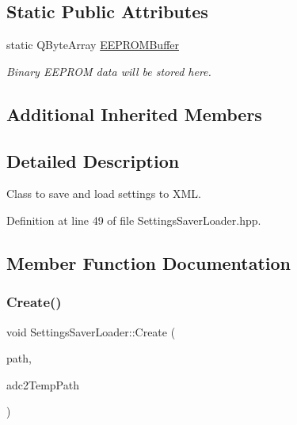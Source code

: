 \subsection*{Static Public Attributes}
\begin{DoxyCompactItemize}
\item 
\mbox{\label{class_settings_saver_loader_acc059094bacde4bb24fc7a8dbd1336e9}} 
static Q\+Byte\+Array \hyperlink{class_settings_saver_loader_acc059094bacde4bb24fc7a8dbd1336e9}{E\+E\+P\+R\+O\+M\+Buffer}
\begin{DoxyCompactList}\small\item\em Binary E\+E\+P\+R\+OM data will be stored here. \end{DoxyCompactList}\end{DoxyCompactItemize}
\subsection*{Additional Inherited Members}


\subsection{Detailed Description}
Class to save and load settings to X\+ML. 

Definition at line 49 of file Settings\+Saver\+Loader.\+hpp.



\subsection{Member Function Documentation}
\mbox{\label{class_settings_saver_loader_a23524241e3edea7f26b72807c0090bdc}} 
\subsubsection{\texorpdfstring{Create()}{Create()}}
{\footnotesize\ttfamily void Settings\+Saver\+Loader\+::\+Create (\begin{DoxyParamCaption}\item[{Q\+String}]{path,  }\item[{Q\+String}]{adc2\+Temp\+Path }\end{DoxyParamCaption})\hspace{0.3cm}{\ttfamily [virtual]}}



